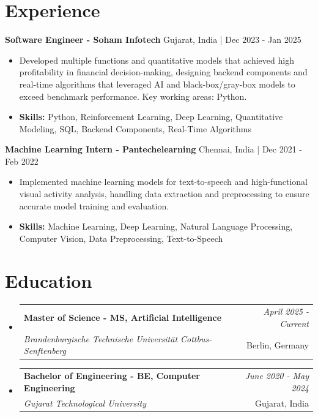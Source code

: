 \documentclass[a4paper,11pt]{article}
\makeatletter
\newcommand{\resumeSubheading}[4]{
\vspace{0.5mm}\item
    \begin{tabular*}{0.98\textwidth}[t]{l@{\extracolsep{\fill}}r}
        \textbf{#1} & \textit{\footnotesize{#4}} \\
        \textit{\footnotesize{#3}} &  \footnotesize{#2}\\
    \end{tabular*}
    \vspace{-2.4mm}
}
\makeatother
\begin{document}
\section{\textbf{Experience}}


\vspace{1mm}
  \textbf{Software Engineer - Soham Infotech} \hfill Gujarat, India | Dec 2023 - Jan 2025
\vspace{-1.5mm} %
\begin{itemize}
  \item Developed multiple functions and quantitative models that achieved high profitability in financial decision-making, designing backend components and real-time algorithms that leveraged AI and black-box/gray-box models to exceed benchmark performance. Key working areas: Python.

\vspace{-2mm}
  \item \textbf{Skills:} Python, Reinforcement Learning, Deep Learning, Quantitative Modeling, SQL, Backend Components, Real-Time Algorithms
\end{itemize}

\vspace{1mm}
  \textbf{Machine Learning Intern - Pantechelearning} \hfill Chennai, India | Dec 2021 - Feb 2022
\vspace{-1.5mm} %
\begin{itemize}
  \item Implemented machine learning models for text-to-speech and high-functional visual activity analysis, handling data extraction and preprocessing to ensure accurate model training and evaluation.
\vspace{-2mm}
  \item \textbf{Skills:} Machine Learning, Deep Learning, Natural Language Processing, Computer Vision, Data Preprocessing, Text-to-Speech
\end{itemize}\section{\textbf{Education}}
\vspace{-0.4mm}

\begin{itemize}
\resumeSubheading
{Master of Science - MS, Artificial Intelligence }{Berlin, Germany}
{Brandenburgische Technische Universität Cottbus-Senftenberg  }{April 2025 - Current}

\vspace{1.0mm} %
\resumeSubheading
{Bachelor of Engineering - BE, Computer Engineering  }{Gujarat, India}
{Gujarat Technological University }{June 2020 - May 2024}

\end{itemize}
\end{document}
